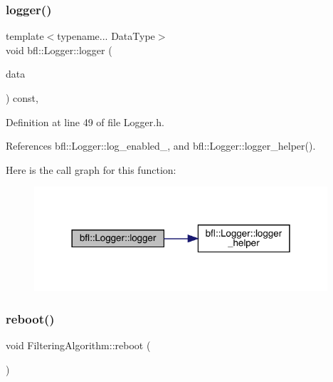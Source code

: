 \subsubsection{\texorpdfstring{logger()}{logger()}\hspace{0.1cm}{\footnotesize\ttfamily [4/4]}}
{\footnotesize\ttfamily template$<$typename... Data\+Type$>$ \\
void bfl\+::\+Logger\+::logger (\begin{DoxyParamCaption}\item[{Data\+Type...}]{data }\end{DoxyParamCaption}) const\hspace{0.3cm}{\ttfamily [inline]}, {\ttfamily [inherited]}}



Definition at line 49 of file Logger.\+h.



References bfl\+::\+Logger\+::log\+\_\+enabled\+\_\+, and bfl\+::\+Logger\+::logger\+\_\+helper().

Here is the call graph for this function\+:
\nopagebreak
\begin{figure}[H]
\begin{center}
\leavevmode
\includegraphics[width=309pt]{classbfl_1_1Logger_a0f0cf7ce956546d94dfb1feb7cebf171_cgraph}
\end{center}
\end{figure}
\mbox{\label{classbfl_1_1FilteringAlgorithm_a6022859aa985474fb997343cc935b11e}} 
\subsubsection{\texorpdfstring{reboot()}{reboot()}}
{\footnotesize\ttfamily void Filtering\+Algorithm\+::reboot (\begin{DoxyParamCaption}{ }\end{DoxyParamCaption})}




